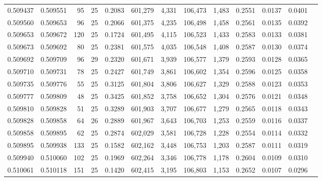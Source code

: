 \begin{tabular}{rrrrrrrrrrrrr}
0.509437 & 0.509551 &  95 &  25 &                                     0.2083 & 601,279 &   4,331 & 106,473 &   1,483 & 0.2551 & 0.0137 & 0.0401 \\
0.509560 & 0.509653 &  96 &  25 &                                     0.2066 & 601,375 &   4,235 & 106,498 &   1,458 & 0.2561 & 0.0135 & 0.0392 \\
0.509653 & 0.509672 & 120 &  25 &                                     0.1724 & 601,495 &   4,115 & 106,523 &   1,433 & 0.2583 & 0.0133 & 0.0381 \\
0.509673 & 0.509692 &  80 &  25 &                                     0.2381 & 601,575 &   4,035 & 106,548 &   1,408 & 0.2587 & 0.0130 & 0.0374 \\
0.509692 & 0.509709 &  96 &  29 &                                     0.2320 & 601,671 &   3,939 & 106,577 &   1,379 & 0.2593 & 0.0128 & 0.0365 \\
0.509710 & 0.509731 &  78 &  25 &                                     0.2427 & 601,749 &   3,861 & 106,602 &   1,354 & 0.2596 & 0.0125 & 0.0358 \\
0.509735 & 0.509776 &  55 &  25 &                                     0.3125 & 601,804 &   3,806 & 106,627 &   1,329 & 0.2588 & 0.0123 & 0.0353 \\
0.509777 & 0.509809 &  48 &  25 &                                     0.3425 & 601,852 &   3,758 & 106,652 &   1,304 & 0.2576 & 0.0121 & 0.0348 \\
0.509810 & 0.509828 &  51 &  25 &                                     0.3289 & 601,903 &   3,707 & 106,677 &   1,279 & 0.2565 & 0.0118 & 0.0343 \\
0.509828 & 0.509858 &  64 &  26 &                                     0.2889 & 601,967 &   3,643 & 106,703 &   1,253 & 0.2559 & 0.0116 & 0.0337 \\
0.509858 & 0.509895 &  62 &  25 &                                     0.2874 & 602,029 &   3,581 & 106,728 &   1,228 & 0.2554 & 0.0114 & 0.0332 \\
0.509895 & 0.509938 & 133 &  25 &                                     0.1582 & 602,162 &   3,448 & 106,753 &   1,203 & 0.2587 & 0.0111 & 0.0319 \\
0.509940 & 0.510060 & 102 &  25 &                                     0.1969 & 602,264 &   3,346 & 106,778 &   1,178 & 0.2604 & 0.0109 & 0.0310 \\
0.510061 & 0.510118 & 151 &  25 &                                     0.1420 & 602,415 &   3,195 & 106,803 &   1,153 & 0.2652 & 0.0107 & 0.0296 \\

\end{tabular}
